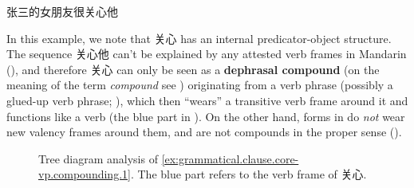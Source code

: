 \documentclass[UTF8, a4paper, oneside, scheme=plain, 12pt]{ctexrep}
\newcommand*{\concept}[1]{\textbf{#1}}
\newcommand*{\term}[1]{\emph{#1}}
\begin{document}
\begin{exe}
    \ex\label{ex:grammatical.clause.core-vp.compounding.1} 张三的女朋友很关心他
\end{exe}

In this example, we note that 关心 has an internal predicator-object structure.
The sequence 关心他 can't be explained by any attested verb frames in Mandarin
(),
and therefore 关心 can only be seen as a \concept{dephrasal compound}
(on the meaning of the term \term{compound} see )
originating from a verb phrase
(possibly a glued-up verb phrase; ),
which then ``wears'' a transitive verb frame around it and functions like a verb
(the blue part in ).
On the other hand, forms in 
do \emph{not} wear new valency frames around them,
and are not compounds in the proper sense (). 

\begin{figure}[H]
    {
        \centering
        \small
        
    }
    \caption{Tree diagram analysis of \eqref{ex:grammatical.clause.core-vp.compounding.1}.
    The blue part refers to the verb frame of 关心.}
    \label{fig:grammatical.clause.core-vp.compounding.1}
\end{figure}
\end{document}
